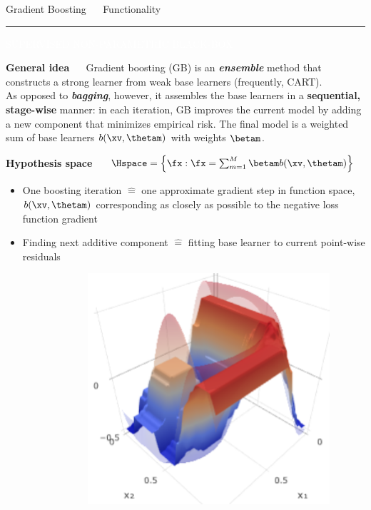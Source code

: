 \documentclass[11pt,compress,t,notes=noshow, xcolor=table]{beamer}
\begin{document}
\LARGE
\begin{frame}{\textcolor{gray!80}{Gradient Boosting} ~~ Functionality}
\normalsize
\vspace{-0.5cm}
\noindent \textcolor{gray!80}{\rule{\textwidth}{1pt}}

\vspace{0.3cm}

\footnotesize

\colorbox{gray!80}{\textcolor{white}{SUPERVISED}} 
\colorbox{gray!80}{\textcolor{white}{NON-PARAMETRIC}} 
\colorbox{gray!80}{\textcolor{white}{BLACK-BOX}} 

\medskip

\textbf{\textcolor{gray!80}{General idea}} ~~ Gradient boosting (GB) is an
\textit{\textbf{ensemble}} method that constructs a strong learner from weak base
learners (frequently, CART). \\
As opposed to \textit{\textbf{bagging}}, however,
it assembles the base learners in a \textbf{sequential, stage-wise} manner: in 
each iteration, GB improves the current model by adding a new component that
minimizes empirical risk. The final model is a weighted sum of base learners 
$b(\xv, \thetam)$ with weights $\betam$.

\medskip

\textbf{\textcolor{gray!80}{Hypothesis space}} ~~
$\Hspace = \left\{ \fx: \fx = \sum_{m = 1}^M \betam b(\xv, \thetam) \right\}$

\medskip

\begin{minipage}{0.5\textwidth}
  \begin{itemize}
    \item One boosting iteration $\widehat{=}$ one approximate gradient step in 
    function space, $b(\xv, \thetam)$ corresponding as closely as possible to 
    the negative loss function gradient
    \item Finding next additive component $\widehat{=}$ fitting base learner
    to current point-wise residuals
  \end{itemize}
\end{minipage}%
\begin{minipage}{0.5\textwidth}
  \includegraphics[width=0.9\textwidth]{figure/gb_3d.PNG}
\end{minipage}


\end{frame}


\endlecture
\end{document}
